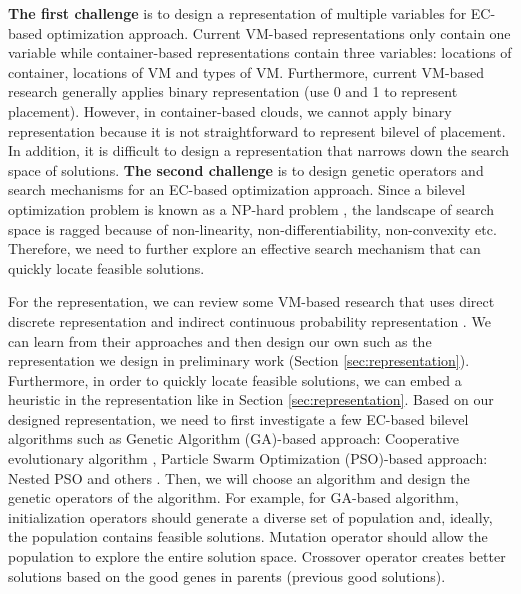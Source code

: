 \begin{enumerate}
	 \textbf{The first challenge} is to design a representation of multiple variables for EC-based optimization approach. Current VM-based representations only contain one variable while container-based representations contain three variables: locations of container, locations of VM and types of VM. Furthermore, current VM-based research generally applies binary representation (use 0 and 1 to represent placement). However, in container-based clouds, we cannot apply binary representation because it is not straightforward to represent bilevel of placement. 
	In addition, it is difficult to design a representation that narrows down the search space of solutions.  \textbf{The second challenge} is to design genetic operators and search mechanisms for an EC-based optimization approach. Since a bilevel optimization problem is known as a NP-hard problem \cite{Mathieu:2011dw}, the landscape of search space is ragged because of non-linearity, non-differentiability, non-convexity etc. Therefore, we need to further explore an effective search mechanism that can quickly locate feasible solutions.

	 For the representation, we can review some VM-based research that uses direct discrete representation \cite{Xu:2010vh} and indirect continuous probability representation \cite{Xiong:2014jq}. We can learn from their approaches and then design our own such as the representation we design in preliminary work (Section \ref{sec:representation}). Furthermore, in order to quickly locate feasible solutions, we can embed a heuristic in the representation like in Section \ref{sec:representation}. 
	Based on our designed representation, we need to first investigate a few EC-based bilevel algorithms such as Genetic Algorithm (GA)-based approach: Cooperative evolutionary algorithm \cite{Legillon:2012dd}, Particle Swarm Optimization (PSO)-based approach: Nested PSO \cite{Li:2006br} and others \cite{Angelo:2013ee, Zhu:2006in}. Then, we will choose an algorithm and design the genetic operators of the algorithm. For example, for GA-based algorithm, initialization operators should generate a diverse set of population and, ideally, the population contains feasible solutions. Mutation operator should allow the population to explore the entire solution space. Crossover operator creates better solutions based on the good genes in parents (previous good solutions).
	


\end{enumerate}
